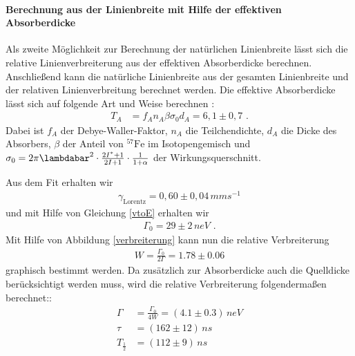 \paragraph{Berechnung aus der Linienbreite mit Hilfe der effektiven Absorberdicke}
Als zweite Möglichkeit zur Berechnung der natürlichen Linienbreite lässt sich die relative Linienverbreiterung aus der effektiven Absorberdicke berechnen. Anschließend kann die natürliche Linienbreite aus der gesamten Linienbreite und der relativen Linienverbreitung berechnet werden. Die effektive Absorberdicke lässt sich auf folgende Art und Weise berechnen \cite{anleitung}:
\begin{align}
	T_A&=f_An_A\beta\sigma_0d_A=6,1\pm0,7\text{ .}
\end{align}
Dabei ist $f_A$ der Debye-Waller-Faktor, $n_A$ die Teilchendichte, $d_A$ die Dicke des Absorbers, $\beta$ der Anteil von $^{57}\mathrm{Fe}$ im Isotopengemisch und $\sigma_0=2\pi\lambdabar^2\cdot\frac{2I^*+1}{2I+1}\cdot\frac1{1+\alpha}$ der Wirkungsquerschnitt.\\


Aus dem Fit erhalten wir \begin{align}\gamma_\mathrm{Lorentz}=0,60\pm0,04\,\si{mms^{-1}}\end{align} und mit Hilfe von Gleichung \ref{vtoE} erhalten wir \begin{align}\Gamma_0=29\pm2\,\si{neV}\text{ .}\end{align} Mit Hilfe von Abbildung \ref{verbreiterung} kann nun die relative Verbreiterung \begin{align}W=\frac{\Gamma_0}{2\Gamma}=1.78\pm0.06\end{align} graphisch bestimmt werden. Da zusätzlich zur Absorberdicke auch die Quelldicke berücksichtigt werden muss, wird die relative Verbreiterung folgendermaßen berechnet::
\begin{align}
	\Gamma&=\frac{\Gamma_0}{4W}=(4.1\pm0.3)\,\si{neV}\\
	\tau&=(162\pm12)\,\si{ns}\\
	T_{\frac12}&=(112\pm9)\,\si{ns}
\end{align}
